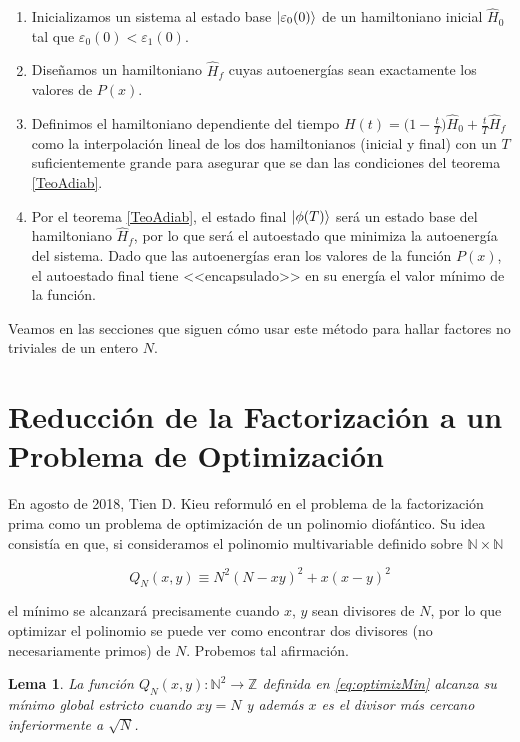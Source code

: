 \documentclass[11pt, spanish]{report}
\numberwithin{equation}{section}
\newtheorem{lema}[defin]{Lema}
\numberwithin{defin}{section}
\newenvironment{yellowBox}{\begin{tcolorbox}[colback=yellow!5!white,colframe=yellow!75!black]}{\end{tcolorbox}}
\begin{document}
\begin{enumerate}
\item Inicializamos un sistema al estado base $\ket{\varepsilon_0(0)}$ de un hamiltoniano inicial $\hat{H}_0$ tal que $\varepsilon_0(0)<\varepsilon_1(0)$.
\item Diseñamos un hamiltoniano $\hat{H}_f$ cuyas autoenergías sean exactamente los valores de $P(x)$.
\item Definimos el hamiltoniano dependiente del tiempo $H(t)=\Big(1-\frac{t}{T}\Big)\hat{H}_0+\frac{t}{T}\hat{H}_f$ como la interpolación lineal de los dos hamiltonianos (inicial y final) con un $T$ suficientemente grande para asegurar que se dan las condiciones del teorema \ref{TeoAdiab}.
\item Por el teorema \ref{TeoAdiab}, el estado final $\ket{\phi(T)}$ será un estado base del hamiltoniano $\hat{H}_f$, por lo que será el autoestado que minimiza la autoenergía del sistema. Dado que las autoenergías eran los valores de la función $P(x)$, el autoestado final tiene <<encapsulado>> en su energía el valor mínimo de la función.
\end{enumerate}

Veamos en las secciones que siguen cómo usar este método para hallar factores no triviales de un entero $N$.


\section{Reducción de la Factorización a un Problema de Optimización}

En agosto de 2018, Tien D. Kieu reformuló en \cite{2018arXiv180802781K} el problema de la factorización prima como un problema de optimización de un polinomio diofántico. Su idea consistía en que, si consideramos el polinomio multivariable definido sobre $\mathbb{N}\times\mathbb{N}$

\begin{equation}\label{eq:optimizMin}
Q_N(x,y)\equiv N^2(N-xy)^2+x(x-y)^2
\end{equation}

el mínimo se alcanzará precisamente cuando $x$, $y$ sean divisores de $N$, por lo que optimizar el polinomio se puede ver como encontrar dos divisores (no necesariamente primos) de $N$. Probemos tal afirmación.\\

\begin{yellowBox}
\begin{lema}
La función $Q_N(x,y):\mathbb{N}^2\rightarrow\mathbb{Z}$ definida en \ref{eq:optimizMin} alcanza su mínimo global estricto cuando $xy=N$ y además $x$ es el divisor más cercano inferiormente a $\sqrt{N}$.
\end{lema}
\end{yellowBox}
\end{document}
